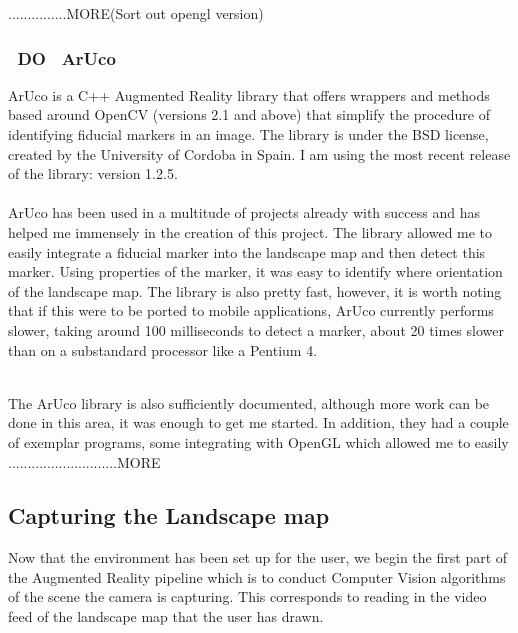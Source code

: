 \documentclass[11pt]{article}
\begin{document}
...............MORE(Sort out opengl version)

\subsubsection{~DO~ ArUco}
ArUco is a C++ Augmented Reality library that offers wrappers and methods
based around OpenCV (versions 2.1 and above) that simplify the procedure
of identifying fiducial markers in an image. The library is under the BSD
license, created by the University of Cordoba in Spain. I am using the
most recent release of the library: version 1.2.5.\\
\\
ArUco has been used in a multitude of projects already with success and 
has helped me immensely in the creation of this project. The library 
allowed me to easily integrate a fiducial marker into the landscape map
and then detect this marker. Using properties of the marker, it was easy
to identify where orientation of the landscape map. The library is also 
pretty fast, however, it is worth noting that if this were to be ported
to mobile applications, ArUco currently performs slower, taking
around 100 milliseconds to detect a marker, about 20 times slower than
on a substandard processor like a Pentium 4.

\\
The ArUco library is also sufficiently documented, although more work can
be done in this area, it was enough to get me started. In addition, they
had a couple of exemplar programs, some integrating with OpenGL which 
allowed me to easily
............................MORE

\subsection{Capturing the Landscape map}
Now that the environment has been set up for the user, we begin the first
part of the Augmented Reality pipeline which is to conduct Computer
Vision algorithms of the scene the camera is capturing. This corresponds to
reading in the video feed of the landscape map that the user has drawn.
\end{document}
